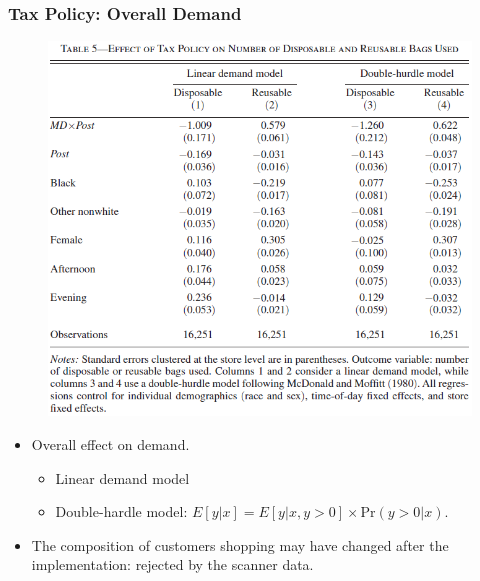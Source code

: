 \documentclass[dvipdfmx,11pt]{beamer}
\begin{document}
\begin{frame}\frametitle{Tax Policy: Overall Demand}
  \begin{figure}[ht]
    \centering
    \includegraphics[scale = .5]{0807tanji/T5}
  \end{figure}
  \begin{itemize}
    \small
    \item Overall effect on demand.
    \begin{itemize}
      \footnotesize
      \item Linear demand model
      \item Double-hardle model: $E[y | x] = E[y | x, y > 0] \times \text{Pr}(y > 0 | x)$.
    \end{itemize}
    \item The composition of customers shopping may have changed after the implementation: rejected by the scanner data.
  \end{itemize}
\end{frame}
\end{document}
